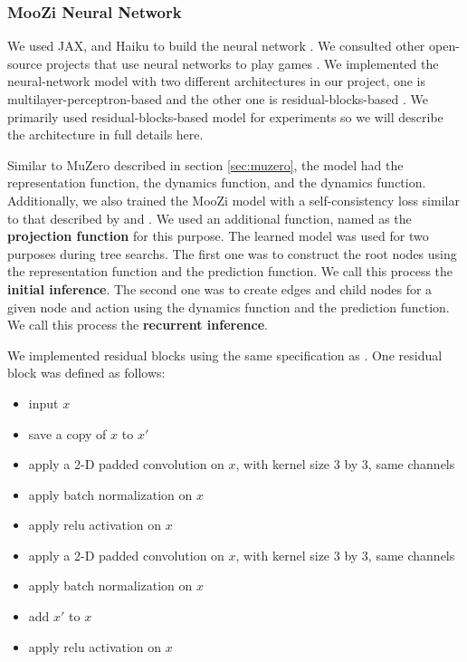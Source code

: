 \subsubsection{MooZi Neural Network}
We used JAX, and Haiku to build the neural network \cite{HaikuSonnetJAX_Hennigan.Cai.ea_2020, CompilingMachineLearning_Frostig.Johnson.ea_2018, JAXAutogradXLA_JamesBradbury.RoyFrostig.ea_2022}.
We consulted other open-source projects that use neural networks to play games \cite{MuZeroGeneral_Duvaud.AureleHainaut_2022, MasteringAtariGames_Ye.Liu.ea_2021,AcceleratingSelfPlayLearning_Wu_2020,AcceleratingSelfPlayLearning_Wu_2020}.
We implemented the neural-network model with two different architectures in our project, one is multilayer-perceptron-based and the other one is residual-blocks-based \cite{DeepResidualLearning_He.Zhang.ea_2016}.
We primarily used residual-blocks-based model for experiments so we will describe the architecture in full details here.

Similar to MuZero described in section \ref{sec:muzero}, the model had the representation function, the dynamics function, and the dynamics function.
Additionally, we also trained the MooZi model with a self-consistency loss similar to that described by \citeauthor{MasteringAtariGames_Ye.Liu.ea_2021} and \citeauthor{VisualizingMuZeroModels_deVries.Voskuil.ea_2021} \cite{MasteringAtariGames_Ye.Liu.ea_2021,VisualizingMuZeroModels_deVries.Voskuil.ea_2021}.
We used an additional function, named as the \textbf{projection function} for this purpose.
The learned model was used for two purposes during tree searchs.
The first one was to construct the root nodes using the representation function and the prediction function.
We call this process the \textbf{initial inference}.
The second one was to create edges and child nodes for a given node and action using the dynamics function and the prediction function.
We call this process the \textbf{recurrent inference}.

We implemented residual blocks using the same specification as \citeauthor{DeepResidualLearning_He.Zhang.ea_2016} \cite{DeepResidualLearning_He.Zhang.ea_2016}.
One residual block was defined as follows:
\begin{itemize}
    \item input $x$
    \item save a copy of $x$ to $x'$
    \item apply a 2-D padded convolution on $x$, with kernel size 3 by 3, same channels
    \item apply batch normalization on $x$
    \item apply relu activation on $x$
    \item apply a 2-D padded convolution on $x$, with kernel size 3 by 3, same channels
    \item apply batch normalization on $x$
    \item add $x'$ to $x$
    \item apply relu activation on $x$
\end{itemize}

